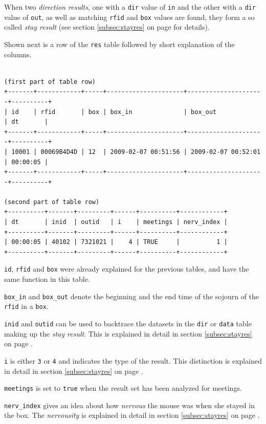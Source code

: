 When two \textit{direction results}, one with a \lstinline|dir| value of \lstinline|in| and the other with a \lstinline|dir| value of \lstinline|out|, as well as matching \lstinline|rfid| and \lstinline|box| values are found, they form a so called \textit{stay result} (see section \ref{subsec:stayres} on page \pageref{subsec:stayres} for details).

Shown next is a row of the \lstinline|res| table followed by short explanation of the columns.

\codescript
\begin{lstlisting}[frame=none]

(first part of table row)
+-------+------------+-----+---------------------+---------------------+----------+
| id    | rfid       | box | box_in              | box_out             | dt       |
+-------+------------+-----+---------------------+---------------------+----------+
| 10001 | 00069B4D4D | 12  | 2009-02-07 00:51:56 | 2009-02-07 00:52:01 | 00:00:05 |
+-------+------------+-----+---------------------+---------------------+----------+

(second part of table row)
+----------+-------+---------+------+----------+------------+
| dt       | inid  | outid   | i    | meetings | nerv_index |
+----------+-------+---------+------+----------+------------+
| 00:00:05 | 40102 | 7321021 |    4 | TRUE     |          1 | 
+----------+-------+---------+------+----------+------------+

\end{lstlisting}

\begin{mydesc}
	\item \lstinline|id|, \lstinline|rfid| and \lstinline|box| were already explained for the previous tables, and have the same function in this table.
	\item \lstinline|box_in| and \lstinline|box_out| denote the beginning and the end time of the sojourn of the \lstinline|rfid| in a \lstinline|box|.
	 \item \lstinline|inid| and \lstinline|outid| can be used to backtrace the datasets in the \lstinline|dir| or \lstinline|data| table making up the \textit{stay result}. This is explained in detail in section \ref{subsec:stayres} on page \pageref{subsec:stayres}.
	 \item \lstinline|i| is either \lstinline|3| or \lstinline|4| and indicates the type of the result. This distinction is explained in detail in section \ref{subsec:stayres} on page \pageref{subsec:stayres}.
	 \item \lstinline|meetings| is set to \lstinline|true| when the result set has been analyzed for meetings.
	 \item \lstinline|nerv_index| gives an idea about how \textit{nervous} the mouse was when she stayed in the box. The \textit{nervousity} is explained in detail in section \ref{subsec:stayres} on page \pageref{subsec:stayres}. 
\end{mydesc}

